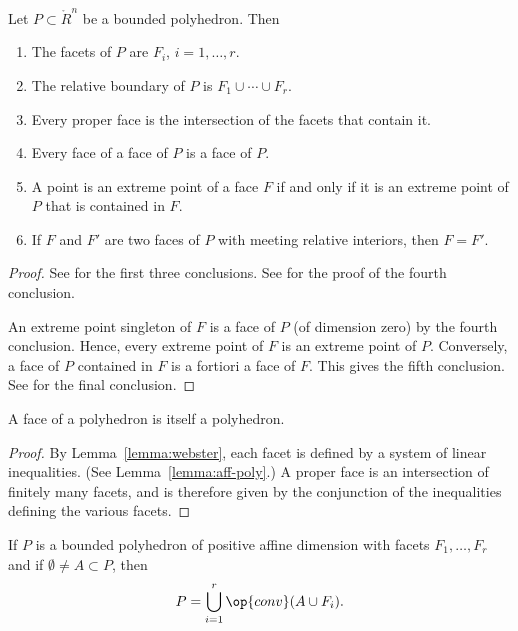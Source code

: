 \begin{lemma}[]\cutrate{}\label{lemma:webster}  
Let $P\subset\ring{R}^n$ be a bounded polyhedron.  Then
%
\begin{enumerate}
\item The facets of $P$ are $F_i$, $i=1,\ldots,r$.
\item The relative boundary of $P$ is $F_1\cup\cdots \cup F_r$.
\item Every proper face is the intersection of the facets that contain it.
\item Every face of a face of $P$ is a face of $P$.
\item A point is an extreme point of a face $F$ if and only if it is an extreme point of $P$
that is contained in $F$.
\item If $F$ and $F'$ are two faces of $P$ with meeting relative interiors, then $F=F'$.
\end{enumerate}
\end{lemma}
%
%
%

\begin{proof} See \cite[Thm~3.2.1]{webster:1994} for the first three
conclusions.  See \cite[Th~2.6.5]{webster:1994} for the proof of the
fourth conclusion.

An extreme point singleton of $F$ is a face of $P$ (of
dimension zero) by the fourth conclusion.  Hence, every extreme point of $F$
is an extreme point of $P$.  Conversely, a face of $P$ contained in $F$ is a
fortiori a face of $F$.  This gives the fifth conclusion.
See \cite[Cor~2.6.7]{webster:1994} for the final conclusion.
\end{proof}

\begin{corollary}\cutrate{}
A face of a polyhedron is itself a polyhedron.  
\end{corollary}

\begin{proof} By Lemma~\ref{lemma:webster}, each facet is defined by a
system of linear inequalities.  (See Lemma~\ref{lemma:aff-poly}.)  A
proper face is an intersection of finitely many facets, and is
therefore given by the conjunction of the inequalities defining the
various facets.
\end{proof}

\begin{lemma}[]\label{lemma:facet-partition}
  If $P$ is a bounded polyhedron of positive affine dimension with
  facets $F_1,\ldots,F_r$ and if $\emptyset\ne A\subset P$, then
\[ 
P = \bigcup_{i=1}^r \op{conv}(A\cup F_i).
\] 
\end{lemma}

